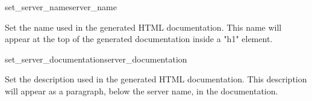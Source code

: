\begin{methoddesc}[DocCGIXMLRPCRequestHandler]{set_server_name}{server_name}

Set the name used in the generated HTML documentation. This name will
appear at the top of the generated documentation inside a "h1"
element.

\end{methoddesc}


\begin{methoddesc}[DocCGIXMLRPCRequestHandler]{set_server_documentation}{server_documentation}

Set the description used in the generated HTML documentation. This
description will appear as a paragraph, below the server name, in the
documentation.

\end{methoddesc}
